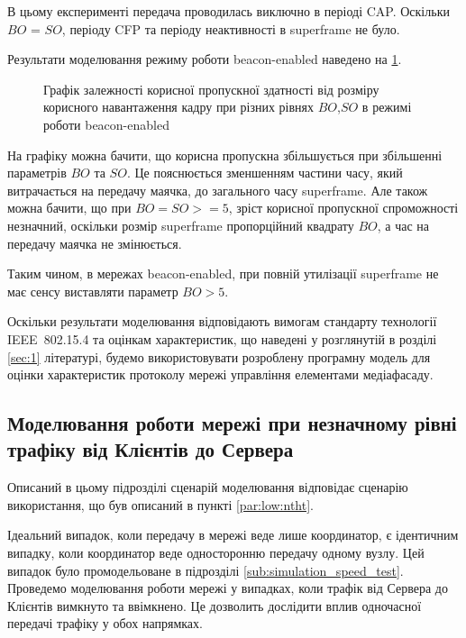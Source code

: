\documentclass[a4paper,ukrainian,utf8,nocolumnsxix,floatsection,equationsection]{eskdtext}
\newcommand{\longcaption}[1]{\captionsetup{style=figureLongCaption}\caption{#1}}
\newcommand{\iee}[0]{IEEE~802.15.4\xspace}
\newcommand{\bem}[0]{beacon-enabled\xspace}
\begin{document}
В цьому експерименті передача проводилась виключно в періоді CAP. Оскільки $BO$ = $SO$, періоду CFP та періоду неактивності в superframe не було.

Результати моделювання режиму роботи \bem наведено на \cref{fig:result_tp_beacon}.

\begin{figure}[htbp]
	\centering
	\longcaption{\label{fig:result_tp_beacon}Графік залежності корисної пропускної здатності від розміру корисного навантаження кадру при різних рівнях $BO$,$SO$ в режимі роботи \bem}
\end{figure}

На графіку можна бачити, що корисна пропускна збільшується при збільшенні параметрів $BO$ та $SO$. Це пояснюється зменшенням частини часу, який витрачається на передачу маячка, до загального часу superframe. Але також можна бачити, що при $BO=SO>=5$, зріст корисної пропускної спроможності незначний, оскільки розмір superframe пропорційний квадрату $BO$, а час на передачу маячка не змінюється.

Таким чином, в мережах \bem, при повній утилізації superframe не має сенсу виставляти параметр $BO>5$. 

Оскільки результати моделювання відповідають вимогам стандарту технології \iee та оцінкам характеристик, що наведені у розглянутій в розділі \ref{sec:1} літературі, будемо використовувати розроблену програмну модель для оцінки характеристик протоколу мережі управління елементами медіафасаду.

\subsection{Моделювання роботи мережі при незначному рівні трафіку від Клієнтів до Сервера}
\label{sub:simulation_backtraf_nobeac}

Описаний в цьому підрозділі сценарій моделювання відповідає сценарію використання, що був описаний в пункті \ref{par:low:ntht}.

Ідеальний випадок, коли передачу в мережі веде лише координатор, є ідентичним випадку, коли координатор веде односторонню передачу одному вузлу. Цей випадок було промодельоване в підрозділі \ref{sub:simulation_speed_test}. Проведемо моделювання роботи мережі у випадках, коли трафік від Сервера до Клієнтів вимкнуто та ввімкнено. Це дозволить дослідити вплив одночасної передачі трафіку у обох напрямках.
\end{document}
